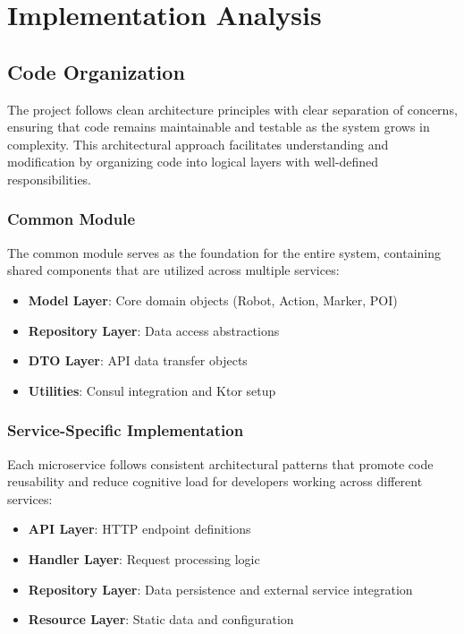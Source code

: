 \documentclass[runningheads]{llncs}
\begin{document}
%
%
%
\section{Implementation Analysis}

\subsection{Code Organization}

The project follows clean architecture principles with clear separation of concerns, ensuring that code remains maintainable and testable as the system grows in complexity. This architectural approach facilitates understanding and modification by organizing code into logical layers with well-defined responsibilities.

\subsubsection{Common Module}

The common module serves as the foundation for the entire system, containing shared components that are utilized across multiple services:

\begin{itemize}
    \item \textbf{Model Layer}: Core domain objects (Robot, Action, Marker, POI)
    \item \textbf{Repository Layer}: Data access abstractions
    \item \textbf{DTO Layer}: API data transfer objects
    \item \textbf{Utilities}: Consul integration and Ktor setup
\end{itemize}

\subsubsection{Service-Specific Implementation}

Each microservice follows consistent architectural patterns that promote code reusability and reduce cognitive load for developers working across different services:

\begin{itemize}
    \item \textbf{API Layer}: HTTP endpoint definitions
    \item \textbf{Handler Layer}: Request processing logic
    \item \textbf{Repository Layer}: Data persistence and external service integration
    \item \textbf{Resource Layer}: Static data and configuration
\end{itemize}
\end{document}
